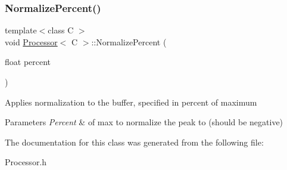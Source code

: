 \subsubsection{\texorpdfstring{Normalize\+Percent()}{NormalizePercent()}}
{\footnotesize\ttfamily template$<$class C $>$ \\
void \hyperlink{classProcessor}{Processor}$<$ C $>$\+::Normalize\+Percent (\begin{DoxyParamCaption}\item[{float}]{percent }\end{DoxyParamCaption})\hspace{0.3cm}{\ttfamily [inline]}}

Applies normalization to the buffer, specified in percent of maximum


\begin{DoxyParams}{Parameters}
{\em Percent} & of max to normalize the peak to (should be negative) \\
\hline
\end{DoxyParams}


The documentation for this class was generated from the following file\+:\begin{DoxyCompactItemize}
\item 
Processor.\+h\end{DoxyCompactItemize}
